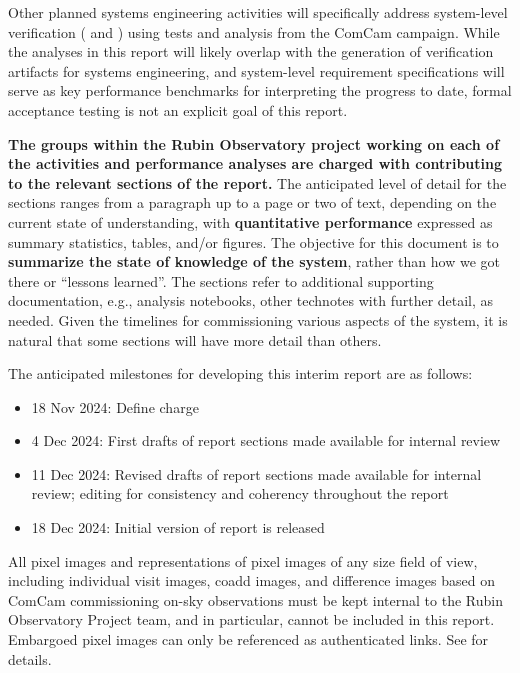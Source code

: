Other planned systems engineering activities will specifically address system-level verification ( and ) using tests and analysis from the ComCam campaign.
While the analyses in this report will likely overlap with the generation of verification artifacts for systems engineering, and system-level requirement specifications will serve as key performance benchmarks for interpreting the progress to date, formal acceptance testing is not an explicit goal of this report.

\textbf{The groups within the Rubin Observatory project working on each of the activities and performance analyses are charged with contributing to the relevant sections of the report.}
The anticipated level of detail for the sections ranges from a paragraph up to a page or two of text, depending on the current state of understanding, with \textbf{quantitative performance} expressed as summary statistics, tables, and/or figures.
The objective for this document is to \textbf{summarize the state of knowledge of the system}, rather than how we got there or ``lessons learned''.
The sections refer to additional supporting documentation, e.g., analysis notebooks, other technotes with further detail, as needed.
Given the timelines for commissioning various aspects of the system, it is natural that some sections will have more detail than others.

The anticipated milestones for developing this interim report are as follows:

\begin{itemize}

    \item 18 Nov 2024: Define charge

    \item 4 Dec 2024: First drafts of report sections made available for internal review

    \item 11 Dec 2024: Revised drafts of report sections made available for internal review; editing for consistency and coherency throughout the report

    \item 18 Dec 2024: Initial version of report is released

\end{itemize}

\begin{warning}
    All pixel images and representations of pixel images of any size field of view, including individual visit images, coadd images, and difference images based on ComCam commissioning on-sky observations must be kept internal to the Rubin Observatory Project team, and in particular, cannot be included in this report.
    Embargoed pixel images can only be referenced as authenticated links.
    See  for details.
\end{warning}